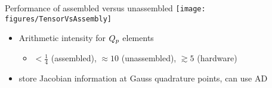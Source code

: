 \documentclass{beamer}
\begin{document}



\begin{frame}[shrink=5]{Performance of assembled versus unassembled}
  \vspace{1ex}
  \texttt{[image: figures/TensorVsAssembly]} \\
  \begin{itemize}
  \item Arithmetic intensity for $Q_{p}$ elements
    \begin{itemize}
    \item $< \frac 1 4$ (assembled), $\approx 10$ (unassembled), $\gtrsim 5$ (hardware)
    \end{itemize}
  \item store Jacobian information at Gauss quadrature points, can use AD
  \end{itemize}
\end{frame}


\end{document}
